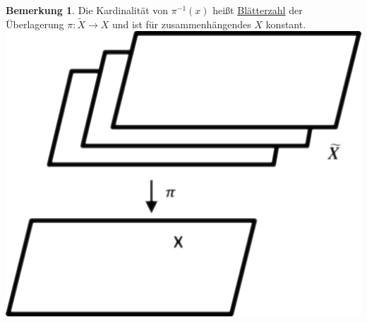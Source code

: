 \documentclass[a4paper,11pt,notitlepage]{report}
\theoremstyle{definition}
\newtheorem{remark}{Bemerkung}[chapter]
\begin{document}
\begin{remark}
	Die Kardinalität von $\pi^{-1}(x)$ heißt \underline{Blätterzahl} der Überlagerung $\pi \colon \tilde{X} \rightarrow X$ und ist für zusammenhängendes $X$ konstant.
	\newline \includegraphics[scale=0.4]{images/Blaetterzahl.png}
\end{remark}
\end{document}
